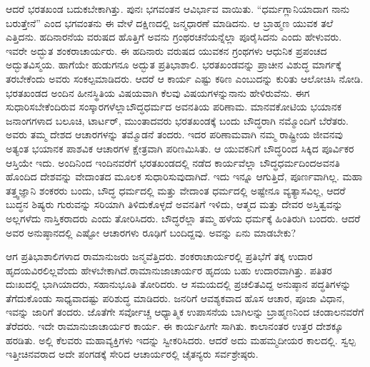 ಆದರೆ ಭರತಖಂಡ ಬದುಕಬೇಕಾಗಿತ್ತು. ಪುನಃ ಭಗವಂತನ ಆವಿರ್ಭಾವ ವಾಯಿತು. “ಧರ್ಮಗ್ಲಾನಿಯಾದಾಗ ನಾನು ಬರುತ್ತೇನೆ” ಎಂದ ಭಗವಂತನು ಈ ವೇಳೆ ದಕ್ಷಿಣದಲ್ಲಿ ಜನ್ಮಧಾರಣೆ ಮಾಡಿದನು. ಆ ಬ್ರಾಹ್ಮಣ ಯುವಕ ತಲೆ ಎತ್ತಿದನು. ಹದಿನಾರನೆಯ ವರುಷದ ಹೊತ್ತಿಗೆ ಅವನು ಗ್ರಂಥರಚನೆಯನ್ನೆಲ್ಲಾ ಪೂರೈಸಿದನು ಎಂದು ಹೇಳುವರು. ಇವರೇ ಅದ್ಭುತ ಶಂಕರಾಚಾರ್ಯರು. ಈ ಹದಿನಾರು ವರುಷದ ಯುವಕನ ಗ್ರಂಥಗಳು ಆಧುನಿಕ ಪ್ರಪಂಚದ ಅದ್ಭುತವಿಸ್ಮಯ. ಹಾಗೆಯೇ ಹುಡುಗನೂ ಅದ್ಭುತ ಪ್ರತಿಭಾಶಾಲಿ. ಭರತಖಂಡವನ್ನು ಪ್ರಾಚೀನ ವಿಶುದ್ಧ ಮಾರ್ಗಕ್ಕೆ ತರಬೇಕೆಂದು ಅವರು ಸಂಕಲ್ಪಮಾಡಿದರು. ಆದರೆ ಆ ಕಾರ್ಯ ಎಷ್ಟು ಕಠಿಣ ಎಂಬುದನ್ನು ಕುರಿತು ಆಲೋಚಿಸಿ ನೋಡಿ. ಭರತಖಂಡದ ಅಂದಿನ ಹೀನಸ್ಥಿತಿಯ ವಿಷಯವಾಗಿ ಕೆಲವು ವಿಷಯಗಳನ್ನು\break ನಾನು ಹೇಳಿರುವೆನು. ಈಗ ಸುಧಾರಿಸಬೇಕೆಂದಿರುವ ಸಂಸ್ಕಾರಗಳೆಲ್ಲಾ\break ಬೌದ್ಧಧರ್ಮದ ಅವನತಿಯ ಪರಿಣಾಮ. ಮಾನವಕೋಟಿಯ ಭಯಾನಕ ಜನಾಂಗಗಳಾದ ಬಲೂಚಿ, ಟಾರ್ಟರ್​, ಮುಂತಾದವರು ಭರತಖಂಡಕ್ಕೆ ಬಂದು ಬೌದ್ಧರಾಗಿ ನಮ್ಮೊಂದಿಗೆ ಬೆರೆತರು. ಅವರು ತಮ್ಮ ದೇಶದ ಆಚಾರಗಳನ್ನು ತಮ್ಮೊಡನೆ ತಂದರು. ಇದರ ಪರಿಣಾಮವಾಗಿ ನಮ್ಮ ರಾಷ್ಟ್ರೀಯ ಜೀವನವು ಅತ್ಯಂತ ಭಯಾನಕ ಪಾಶವಿಕ ಆಚಾರಗಳ ಕ್ಷೇತ್ರವಾಗಿ ಪರಿಣಮಿಸಿತು. ಆ ಯುವಕನಿಗೆ ಬೌದ್ಧರಿಂದ ಸಿಕ್ಕಿದ ಪೂರ್ವಿಕರ ಆಸ್ತಿಯೇ ಇದು. ಅಂದಿನಿಂದ ಇಂದಿನವರೆಗೆ ಭರತಖಂಡದಲ್ಲಿ ನಡೆದ ಕಾರ್ಯವೆಲ್ಲಾ ಬೌದ್ಧಧರ್ಮದಿಂದ\break ಅವನತಿ ಹೊಂದಿದ ದೇಶವನ್ನು ವೇದಾಂತದ ಮೂಲಕ ಸುಧಾರಿಸುವುದಾಗಿದೆ. ಇದು ಇನ್ನೂ ಆಗುತ್ತಿದೆ, ಪೂರ್ಣವಾಗಿಲ್ಲ. ಮಹಾ ತತ್ತ್ವಜ್ಞಾನಿ ಶಂಕರರು ಬಂದು, ಬೌದ್ಧ ಧರ್ಮದಲ್ಲಿ ಮತ್ತು ವೇದಾಂತ ಧರ್ಮದಲ್ಲಿ ಅಷ್ಟೇನೂ ವ್ಯತ್ಯಾಸವಿಲ್ಲ, ಆದರೆ ಬುದ್ಧನ ಶಿಷ್ಯರು ಗುರುವನ್ನು ಸರಿಯಾಗಿ ತಿಳಿದುಕೊಳ್ಳದೆ ಅವನತಿಗೆ ಇಳಿದು, ಆತ್ಮದ ಮತ್ತು ದೇವರ ಅಸ್ತಿತ್ವವನ್ನು ಅಲ್ಲಗಳೆದು ನಾಸ್ತಿಕರಾದರು ಎಂದು ತೋರಿಸಿದರು. ಬೌದ್ಧರೆಲ್ಲಾ ತಮ್ಮ ಹಳೆಯ ಧರ್ಮಕ್ಕೆ ಹಿಂತಿರುಗಿ ಬಂದರು. ಆದರೆ ಅವರ ಅನುಷ್ಠಾನದಲ್ಲಿ ಎಷ್ಟೋ ಆಚಾರಗಳು ರೂಢಿಗೆ ಬಂದಿದ್ದವು. ಅವನ್ನು ಏನು ಮಾಡಬೇಕು?

ಆಗ ಪ್ರತಿಭಾಶಾಲಿಗಳಾದ ರಾಮಾನುಜರು ಜನ್ಮವೆತ್ತಿದರು. ಶಂಕರಾಚಾರ್ಯ\-ರಲ್ಲಿ ಪ್ರತಿಭೆಗೆ ತಕ್ಕ ಉದಾರ ಹೃದಯವಿರಲಿಲ್ಲವೆಂದು ಹೇಳಬೇಕಾಗಿದೆ.\break ರಾಮಾನುಜಾಚಾರ್ಯರ ಹೃದಯ ಬಹು ಉದಾರವಾಗಿತ್ತು. ಪತಿತರ ದುಃಖದಲ್ಲಿ ಭಾಗಿಯಾದರು, ಸಹಾನುಭೂತಿ ತೋರಿದರು. ಆ ಸಮಯದಲ್ಲಿ ಪ್ರಚಲಿತವಿದ್ದ ಅನುಷ್ಠಾನ ಪದ್ಧತಿಗಳನ್ನು ತೆಗೆದುಕೊಂಡು ಸಾಧ್ಯವಾದಷ್ಟು ಪರಿಶುದ್ಧ ಮಾಡಿದರು. ಜನರಿಗೆ ಆವಶ್ಯಕವಾದ ಹೊಸ ಆಚಾರ, ಪೂಜಾ ವಿಧಾನ, ಇವನ್ನು ಜಾರಿಗೆ ತಂದರು. ಜೊತೆಗೇ ಸರ್ವೋಚ್ಚ ಆಧ್ಯಾತ್ಮಿಕ ಉಪಾಸನೆಯ ಬಾಗಿಲನ್ನು ಬ್ರಾಹ್ಮಣನಿಂದ ಚಂಡಾಲನವರೆಗೆ ತೆರೆದರು. ಇದೇ ರಾಮಾನುಜಾಚಾರ್ಯರ ಕಾರ್ಯ. ಈ ಕಾರ್ಯಹೀಗೇ ಸಾಗಿತು. ಕಾಲಾನಂತರ ಉತ್ತರ ದೇಶಕ್ಕೂ ಹರಡಿತು. ಅಲ್ಲಿ ಕೆಲವರು ಮಹಾವ್ಯಕ್ತಿಗಳು ಇದನ್ನು ಸ್ವೀಕರಿಸಿದರು. ಆದರೆ ಅದು ಮಹಮ್ಮದೀಯರ ಕಾಲದಲ್ಲಿ. ಸ್ವಲ್ಪ ಇತ್ತೀಚಿನವರಾದ ಅದೇ ಪಂಗಡಕ್ಕೆ ಸೇರಿದ ಆಚಾರ್ಯರಲ್ಲಿ ಚೈತನ್ಯರು ಸರ್ವಶ್ರೇಷ್ಠರು.

\newpage

